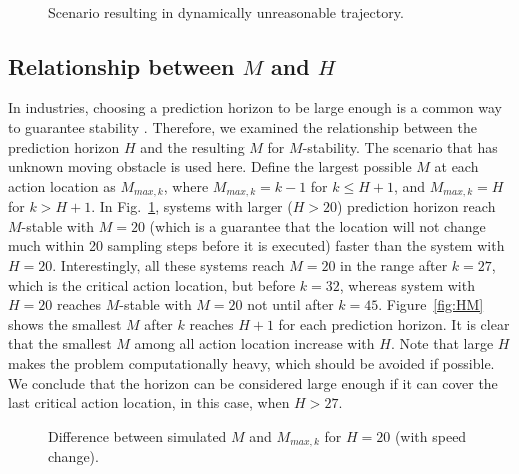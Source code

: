 \documentclass[letterpaper, 10 pt, conference]{ieeeconf}  %
\begin{document}
\begin{figure}[t]
      \centering
      \\
      
      \caption{Scenario resulting in dynamically unreasonable trajectory.}
      
\end{figure}



\subsection{Relationship between $M$ and $H$}

In industries, choosing a prediction horizon to be large enough is a common way to guarantee stability \cite{mayne2000constrained}. Therefore, we examined the relationship between the prediction horizon $H$ and the resulting $M$ for $M$-stability. The scenario that has unknown moving obstacle is used here. Define the largest possible $M$ at each action location as $M_{max,k}$, where $M_{max,k} = k-1$ for $k\leq H+1$, and $M_{max,k} = H$ for $k>H+1$. In Fig.~\ref{fig:HM20}, systems with larger ($H>20$) prediction horizon reach $M$-stable with $M=20$ (which is a guarantee that the location will not change much within 20 sampling steps before it is executed) faster than the system with $H=20$. Interestingly, all these systems reach $M=20$ in the range after $k=27$, which is the critical action location, but before $k=32$, whereas system with $H=20$ reaches $M$-stable with $M=20$ not until after $k=45$. Figure~\ref{fig:HM} shows the smallest $M$ after $k$ reaches $H+1$ for each prediction horizon. It is clear that the smallest $M$ among all action location increase with $H$. Note that large $H$ makes the problem computationally heavy, which should be avoided if possible. We conclude that the horizon can be considered large enough if it can cover the last critical action location, in this case, when $H>27$.


 







\begin{figure}[t]
      \centering
       
      \caption{Difference between simulated $M$ and $M_{max,k}$ for $H=20$ (with speed change). }
      \label{fig:HM20}
\end{figure}
\end{document}
